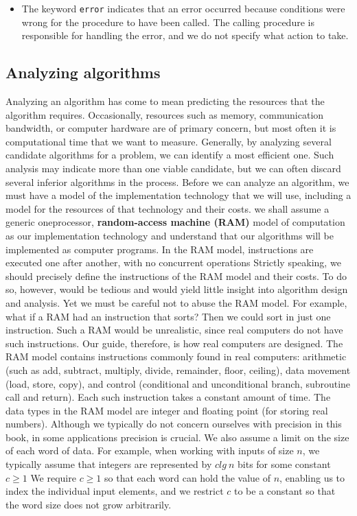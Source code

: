 \documentclass{report}
\begin{document}
\begin{itemize}
        \item The keyword \texttt{error} indicates that an error occurred because conditions were wrong for the procedure to have been called. The calling procedure is responsible for handling the error, and we do not specify what action to take.
    \end{itemize}

    \bigbreak \noindent 
    \subsection{Analyzing algorithms}
    \bigbreak \noindent 
    Analyzing an algorithm has come to mean predicting the resources that the algorithm requires. Occasionally, resources such as memory, communication bandwidth, or computer hardware are of primary concern, but most often it is computational time that we want to measure. Generally, by analyzing several candidate algorithms for a problem, we can identify a most efficient one. Such analysis may indicate more than one viable candidate, but we can often discard several inferior algorithms in the process.
    \bigbreak \noindent 
    Before we can analyze an algorithm, we must have a model of the implementation technology that we will use, including a model for the resources of that technology and their costs.
    \bigbreak \noindent 
    we shall assume a generic oneprocessor, \textbf{random-access machine (RAM)} model of computation as our implementation technology and understand that our algorithms will be implemented as computer programs. In the RAM model, instructions are executed one after another, with no concurrent operations
    \bigbreak \noindent 
    Strictly speaking, we should precisely define the instructions of the RAM model and their costs. To do so, however, would be tedious and would yield little insight into algorithm design and analysis. Yet we must be careful not to abuse the RAM model. For example, what if a RAM had an instruction that sorts? Then we could sort in just one instruction. Such a RAM would be unrealistic, since real computers do not have such instructions. Our guide, therefore, is how real computers are designed. The RAM model contains instructions commonly found in real computers: arithmetic (such as add, subtract, multiply, divide, remainder, floor, ceiling), data movement (load, store, copy), and control (conditional and unconditional branch, subroutine call and return). Each such instruction takes a constant amount of time.
    \bigbreak \noindent 
    The data types in the RAM model are integer and floating point (for storing real numbers). Although we typically do not concern ourselves with precision in this book, in some applications precision is crucial. We also assume a limit on the size of each word of data. For example, when working with inputs of size $n$, we typically assume that integers are represented by $clg\ n$ bits for some constant $c \geq 1$ We require $c \geq 1$ so that each word can hold the value of $n$, enabling us to index the individual input elements, and we restrict $c$ to be a constant so that the word size does not grow arbitrarily.
\end{document}

